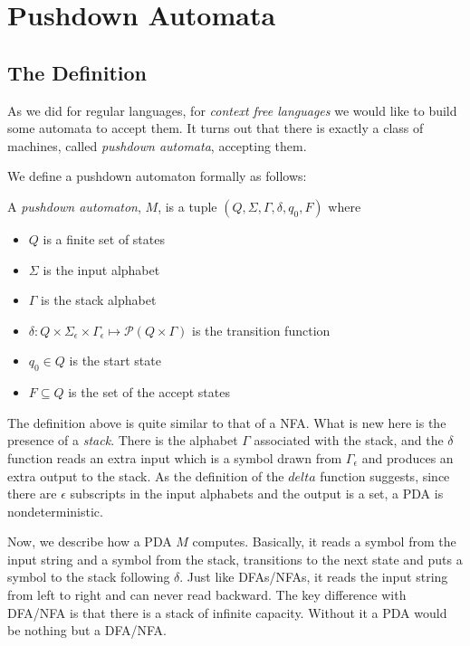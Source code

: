 \documentclass[11pt]{article}
\begin{document}
\section{Pushdown Automata}

\subsection{The Definition}

As we did for regular languages, for \emph{context free languages} we would like to build some
automata to accept them. It turns out that there is exactly a class of machines, called \emph{
pushdown automata}, accepting them.

We define a pushdown automaton formally as follows:

\begin{definition}
A \emph{pushdown automaton}, $M$, is a tuple $(Q,\Sigma,\Gamma,\delta,q_0,F)$ where
\begin{itemize}
\item $Q$ is a finite set of states
\item $\Sigma$ is the input alphabet
\item $\Gamma$ is the stack alphabet
\item
$\delta : Q \times \Sigma_{\epsilon} \times \Gamma_{\epsilon} \mapsto \mathcal{P}(Q \times \Gamma)$
is the transition function
\item $q_0 \in Q$ is the start state
\item $F \subseteq Q$ is the set of the accept states
\end{itemize}
\end{definition}

The definition above is quite similar to that of a NFA. What is new here is the presence of a
\emph{stack}. There is the alphabet $\Gamma$ associated with the stack, and the $\delta$ function
reads an extra input which is a symbol drawn from $\Gamma_{\epsilon}$ and produces an extra
output to the stack. As the definition of the $delta$ function suggests, since there are
$\epsilon$ subscripts in the input alphabets and the output is a set, a PDA is nondeterministic.

Now, we describe how a PDA $M$ computes. Basically, it reads a symbol from the input string and
a symbol from the stack, transitions to the next state and puts a symbol to the stack following
$\delta$. Just like DFAs/NFAs, it reads the input string from left to right and can never read
backward. The key difference with DFA/NFA is that there is a stack of infinite capacity. Without
it a PDA would be nothing but a DFA/NFA.
\end{document}
